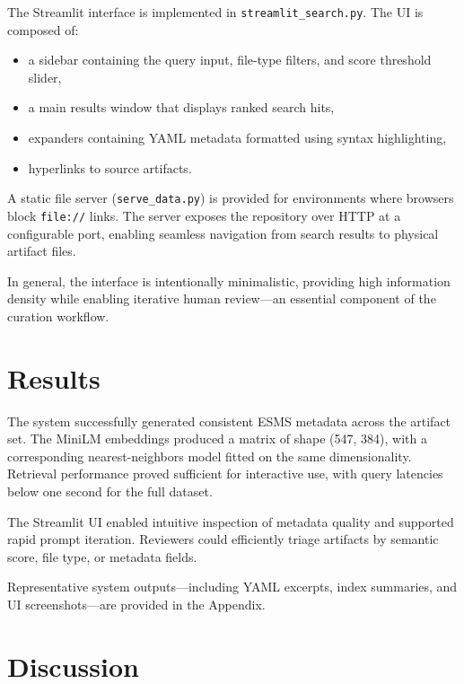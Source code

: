 \documentclass[12pt]{article}
\begin{document}
The Streamlit interface is implemented in 
\texttt{streamlit\_search.py}. The UI is composed of:

\begin{itemize}
    \item a sidebar containing the query input, file-type filters, and score 
    threshold slider,
    \item a main results window that displays ranked search hits,
    \item expanders containing YAML metadata formatted using syntax highlighting,
    \item hyperlinks to source artifacts.
\end{itemize}

A static file server (\texttt{serve\_data.py}) is provided for environments 
where browsers block \texttt{file://} links. The server exposes the repository 
over HTTP at a configurable port, enabling seamless navigation from search 
results to physical artifact files.

In general, the interface is intentionally minimalistic, providing high information density 
while enabling iterative human review—an essential component of the curation 
workflow.

\section{Results}

The system successfully generated consistent ESMS metadata across the artifact set. The MiniLM embeddings produced a matrix of shape (547, 384), with a corresponding nearest-neighbors model fitted on the same dimensionality. Retrieval performance proved sufficient for interactive use, with query latencies below one second for the full dataset.

The Streamlit UI enabled intuitive inspection of metadata quality and supported rapid prompt iteration. Reviewers could efficiently triage artifacts by semantic score, file type, or metadata fields.

Representative system outputs—including YAML excerpts, index summaries, and UI screenshots—are provided in the Appendix.

\section{Discussion}
\end{document}
